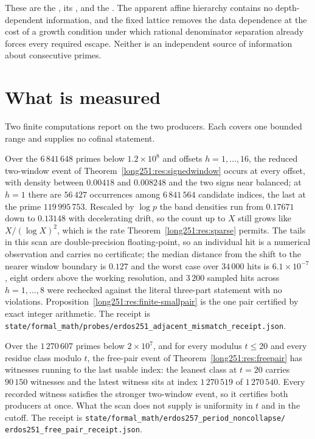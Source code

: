 \noindent These are the
, its
, and the
.  The apparent affine hierarchy contains no depth-dependent
information, and the fixed lattice removes the data dependence at the cost of a
growth condition under which rational denominator separation already forces
every required escape.  Neither is an independent source of information about
consecutive primes.

\section{What is measured}\label{long251:sec:measurements}

Two finite computations report on the two producers.  Each covers one bounded
range and supplies no cofinal statement.

Over the $6\,841\,648$ primes below $1.2\times10^{8}$ and offsets
$h=1,\ldots,16$, the reduced two-window event of
Theorem~\ref{long251:res:signedwindow} occurs at every offset, with density between
$0.00418$ and $0.008248$ and the two signs near balanced; at $h=1$ there are
$56\,427$ occurrences among $6\,841\,564$ candidate indices, the last at the
prime $119\,995\,753$.  Rescaled by $\log p$ the band densities run from
$0.17671$ down to $0.13148$ with decelerating drift, so the count up to $X$
still grows like $X/(\log X)^2$, which is the rate
Theorem~\ref{long251:res:sparse} permits.  The tails in this scan are double-precision
floating-point, so an individual hit is a numerical observation and carries no
certificate; the median distance from the shift to the nearer window boundary
is $0.127$ and the worst case over $34\,000$ hits is $6.1\times10^{-7}$, eight
orders above the working resolution, and $3\,200$ sampled hits across
$h=1,\ldots,8$ were rechecked against the literal three-part statement with no
violations.  Proposition~\ref{long251:res:finite-smallpair} is the one pair certified
by exact integer arithmetic.  The receipt is
\texttt{state/formal\_math/probes/erdos251\_adjacent\_mismatch\_receipt.json}.

Over the $1\,270\,607$ primes below $2\times10^{7}$, and for every modulus
$t\le20$ and every residue class modulo $t$, the free-pair event of
Theorem~\ref{long251:res:freepair} has witnesses running to the last usable index: the
leanest class at $t=20$ carries $90\,150$ witnesses and the latest witness sits
at index $1\,270\,519$ of $1\,270\,540$.  Every recorded witness satisfies the
stronger two-window event, so it certifies both producers at once.  What the
scan does not supply is uniformity in $t$ and in the cutoff.  The receipt is
\texttt{state/formal\_math/erdos257\_period\_noncollapse/}\allowbreak
\texttt{erdos251\_free\_pair\_receipt.json}.

